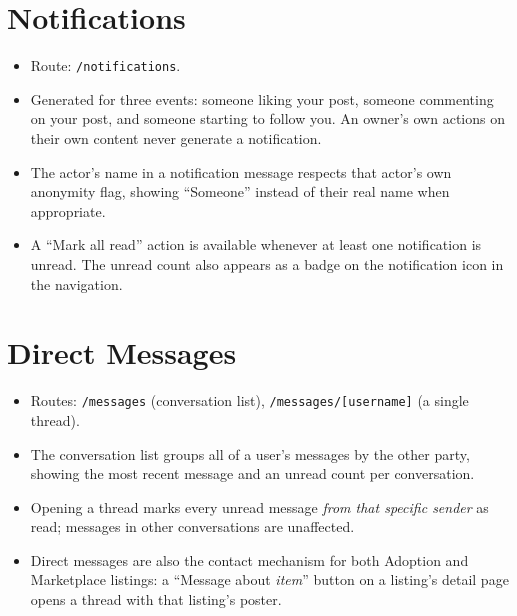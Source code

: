 \documentclass[11pt,a4paper]{article}
\begin{document}
\section{Notifications}
\begin{itemize}[leftmargin=*]
  \item Route: \texttt{/notifications}.
  \item Generated for three events: someone liking your post, someone commenting on
        your post, and someone starting to follow you. An owner's own actions on their
        own content never generate a notification.
  \item The actor's name in a notification message respects that actor's own anonymity
        flag, showing ``Someone'' instead of their real name when appropriate.
  \item A ``Mark all read'' action is available whenever at least one notification is
        unread. The unread count also appears as a badge on the notification icon in
        the navigation.
\end{itemize}

\section{Direct Messages}
\begin{itemize}[leftmargin=*]
  \item Routes: \texttt{/messages} (conversation list), \texttt{/messages/[username]}
        (a single thread).
  \item The conversation list groups all of a user's messages by the other party,
        showing the most recent message and an unread count per conversation.
  \item Opening a thread marks every unread message \emph{from that specific sender} as
        read; messages in other conversations are unaffected.
  \item Direct messages are also the contact mechanism for both Adoption and
        Marketplace listings: a ``Message about \emph{item}'' button on a listing's
        detail page opens a thread with that listing's poster.
\end{itemize}
\end{document}
